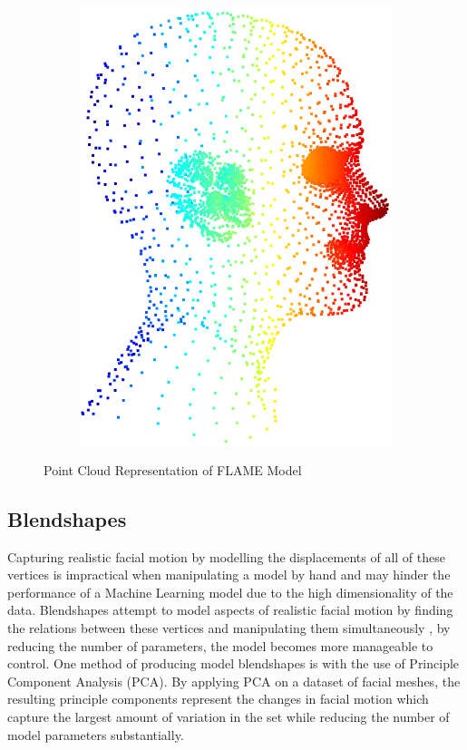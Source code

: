 \begin{figure}[h]
\begin{subfigure}[b]{0.28\textwidth}
        \includegraphics[width=\textwidth]{figures/flame_side.png}
    \end{subfigure}
    \caption{Point Cloud Representation of FLAME Model \cite{Li2017}}\label{fig:FLAME_Point_Cloud}
\end{figure}

\subsection{Blendshapes} \label{blendshapes}
Capturing realistic facial motion by modelling the displacements of all of these vertices is impractical when manipulating a model by hand and may hinder the performance of a Machine Learning model due to the high dimensionality of the data.
Blendshapes attempt to model aspects of realistic facial motion by finding the relations between these vertices and manipulating them simultaneously \cite{Lewis2010}, by reducing the number of parameters, the model becomes more manageable to control.
One method of producing model blendshapes is with the use of Principle Component Analysis (PCA).
By applying PCA on a dataset of facial meshes, the resulting principle components represent the changes in facial motion which capture the largest amount of variation in the set while reducing the number of model parameters substantially.

